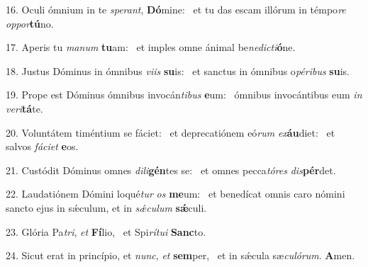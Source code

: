 16. Oculi ómnium in te \textit{spe}\textit{rant}, \textbf{Dó}mine: \ast\  et tu das escam illórum in témpo\textit{re} \textit{op}\textit{por}\textbf{tú}no.\

17. Aperis tu \textit{ma}\textit{num} \textbf{tu}am: \ast\  et imples omne ánimal be\textit{ne}\textit{dic}\textit{ti}\textbf{ó}ne.\

18. Justus Dóminus in ómnibus \textit{vi}\textit{is} \textbf{su}is: \ast\  et sanctus in ómnibus o\textit{pé}\textit{ri}\textit{bus} \textbf{su}is.\

19. Prope est Dóminus ómnibus invocán\textit{ti}\textit{bus} \textbf{e}um: \ast\  ómnibus invocántibus eum \textit{in} \textit{ve}\textit{ri}\textbf{tá}te.\

20. Voluntátem timéntium se fáciet: \dag\  et deprecatiónem eó\textit{rum} \textit{ex}\textbf{áu}diet: \ast\  et salvos \textit{fá}\textit{ci}\textit{et} \textbf{e}os.\

21. Custódit Dóminus omnes \textit{di}\textit{li}\textbf{gén}tes se: \ast\  et omnes pecca\textit{tó}\textit{res} \textit{dis}\textbf{pér}det.\

22. Laudatiónem Dómini loqué\textit{tur} \textit{os} \textbf{me}um: \ast\  et benedícat omnis caro nómini sancto ejus in sǽculum, et in \textit{sǽ}\textit{cu}\textit{lum} \textbf{sǽ}culi.\

23. Glória Pa\textit{tri}, \textit{et} \textbf{Fí}lio, \ast\  et Spi\textit{rí}\textit{tu}\textit{i} \textbf{Sanc}to.\

24. Sicut erat in princípio, et \textit{nunc}, \textit{et} \textbf{sem}per, \ast\  et in sǽcula sæ\textit{cu}\textit{ló}\textit{rum}. \textbf{A}men.\

